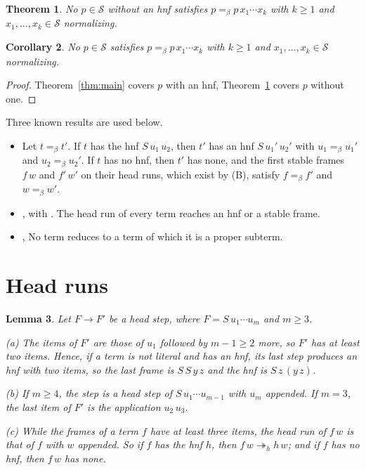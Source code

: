 \documentclass[11pt]{amsart}
\newtheorem{theorem}{Theorem}
\newtheorem{lemma}[theorem]{Lemma}
\newtheorem{corollary}[theorem]{Corollary}
\newcommand{\Ter}{\mathcal S}
\newcommand{\hred}{\twoheadrightarrow_h}
\newcommand{\conv}{=_\beta}
\begin{document}
\begin{theorem}\label{thm:left}
No $p\in\Ter$ without an hnf satisfies $p\conv p\,x_1\cdots x_k$ with $k\ge1$ and
$x_1,\dots,x_k\in\Ter$ normalizing.
\end{theorem}

\begin{corollary}\label{cor:all}
No $p\in\Ter$ satisfies $p\conv p\,x_1\cdots x_k$ with $k\ge1$ and $x_1,\dots,x_k\in\Ter$
normalizing.
\end{corollary}

\begin{proof}
Theorem~\ref{thm:main} covers $p$ with an hnf, Theorem~\ref{thm:left} covers $p$ without one.
\end{proof}

Three known results are used below.
\begin{itemize}
\item[(A)] \citep[Lemma~4, for the model of terms modulo $\conv$]{s6} Let $t\conv t'$. If $t$ has
  the hnf $S\,u_1\,u_2$, then $t'$ has an hnf $S\,u_1'\,u_2'$ with $u_1\conv u_1'$ and
  $u_2\conv u_2'$. If $t$ has no hnf, then $t'$ has none, and the first stable frames $f\,w$ and
  $f'\,w'$ on their head runs, which exist by (B), satisfy $f\conv f'$ and $w\conv w'$.
\item[(B)] \citep[Proposition~9(b), $d=1$]{s3}, with \citep[Proposition~4 and Theorem~9]{s1}.
  The head run of every term reaches an hnf or a stable frame.
\item[(C)] \citep[Cor.~17]{waldmann-ic}, \citep[Theorem~1]{s7} No term reduces to a term of which it is a proper subterm.
\end{itemize}

\section{Head runs}

\begin{lemma}\label{lem:frames}
Let $F\to F'$ be a head step, where $F=S\,u_1\cdots u_m$ and $m\ge3$.

\textup{(a)} The items of $F'$ are those of $u_1$ followed by $m-1\ge2$ more, so $F'$ has at least
  two items. Hence, if a term is not literal and has an hnf, its last step produces an hnf with
  two items, so the last frame is $S\,S\,y\,z$ and the hnf is $S\,z\,(y\,z)$.

\textup{(b)} If $m\ge4$, the step is a head step of $S\,u_1\cdots u_{m-1}$ with $u_m$ appended. If
  $m=3$, the last item of $F'$ is the application $u_2\,u_3$.

\textup{(c)} While the frames of a term $f$ have at least three items, the head run of $f\,w$ is
  that of $f$ with $w$ appended. So if $f$ has the hnf $h$, then $f\,w\hred h\,w$; and if $f$ has
  no hnf, then $f\,w$ has none.
\end{lemma}
\end{document}
